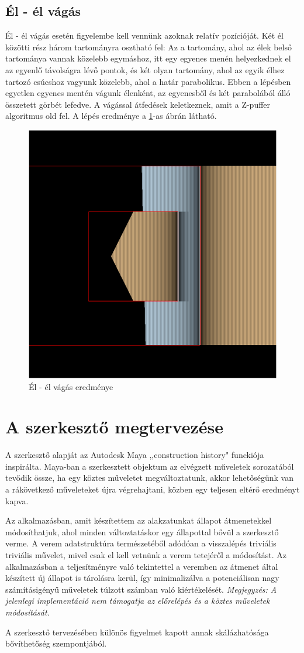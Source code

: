 \subsection{Él - él vágás}
Él - él vágás esetén figyelembe kell vennünk azoknak relatív pozícióját. Két él közötti rész három tartományra osztható fel: Az a tartomány, ahol az élek belső tartománya vannak közelebb egymáshoz, itt egy egyenes menén helyezkednek el az egyenlő távolságra lévő pontok, és két olyan tartomány, ahol az egyik élhez tartozó csúcshoz vagyunk közelebb, ahol a határ parabolikus. Ebben a lépésben egyetlen egyenes mentén vágunk élenként, az egyenesből és két parabolából álló összetett görbét lefedve. A vágással átfedések keletkeznek, amit a Z-puffer algoritmus old fel. A lépés eredménye a \ref{fig:segment_segment_cut-1}-as ábrán látható.

\begin{figure}[H]
    \centering
    \includegraphics[width=.55\linewidth]{images/segment_segment_cut.png}
    \caption{Él - él vágás eredménye}
    \label{fig:segment_segment_cut-1}
\end{figure}

\section{A szerkesztő megtervezése}
A szerkesztő alapját az Autodesk Maya ,,construction history" funckiója inspirálta. Maya-ban a szerkesztett objektum az elvégzett műveletek sorozatából tevődik össze, ha egy köztes műveletet megváltoztatunk, akkor lehetőségünk van a rákövetkező műveleteket újra végrehajtani, közben egy teljesen eltérő eredményt kapva.

Az alkalmazásban, amit készítettem az alakzatunkat állapot átmenetekkel módosíthatjuk, ahol minden változtatáskor egy állapottal bővül a szerkesztő verme. A verem adatstruktúra természetéből adódóan a visszalépés triviális triviális művelet, mivel csak el kell vetnünk a verem tetejéről a módosítást. Az alkalmazásban a teljesítményre való tekintettel a veremben az átmenet által készített új állapot is tárolásra kerül, így minimalizálva a potenciálisan nagy számításigényű műveletek túlzott számban való kiértékelését. \textit{Megjegyzés: A jelenlegi implementáció nem támogatja az előrelépés és a köztes műveletek módosítását.}

A szerkesztő tervezésében különös figyelmet kapott annak skálázhatósága bővíthetőség szempontjából.
